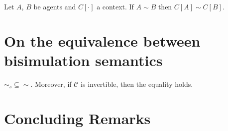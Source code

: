 \documentclass{llncs}
\begin{document}
\begin{proposition}
Let $A$, $B$ be agents and $C[\cdot]$ a context.
If $A \sim B$
then $C[A] \sim C[B]$.
\end{proposition}

\section{On the equivalence between bisimulation semantics}

\begin{theorem}
$\sim_{\mathit{s}} \subseteq \sim$. Moreover, if $\mathcal{C}$ is invertible, then the equality holds.
\end{theorem}



\section{Concluding Remarks}\label{sec:conclusion}


\end{document}
